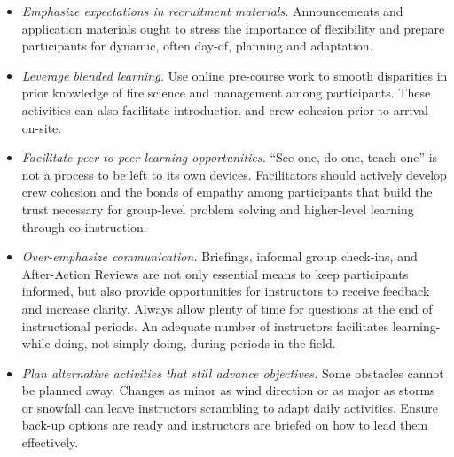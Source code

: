 \documentclass[fire,article,submit,moreauthors,pdftex]{Definitions/mdpi}
\begin{document}
\begin{itemize}
    \item \emph{Emphasize expectations in recruitment materials.} Announcements and application materials ought to stress the importance of flexibility and prepare participants for dynamic, often day-of, planning and adaptation. 
    \item \emph{Leverage blended learning.} Use online pre-course work to smooth disparities in prior knowledge of fire science and management among participants. 
    These activities can also facilitate introduction and crew cohesion prior to arrival on-site.
    \item \emph{Facilitate peer-to-peer learning opportunities.} ``See one, do one, teach one'' is not a process to be left to its own devices. Facilitators should actively develop crew cohesion and the bonds of empathy among participants that build the trust necessary for group-level problem solving and higher-level learning through co-instruction. 
    \item \emph{Over-emphasize communication.} Briefings, informal group check-ins, and After-Action Reviews are not only essential means to keep participants informed, but also provide opportunities for instructors to receive feedback and increase clarity. Always allow plenty of time for questions at the end of instructional periods. An adequate number of instructors facilitates learning-while-doing, not simply doing, during periods in the field. 
    \item \emph{Plan alternative activities that still advance objectives.} Some obstacles cannot be planned away. Changes as minor as wind direction or as major as storms or snowfall can leave instructors scrambling to adapt daily activities. Ensure back-up options are ready and instructors are briefed on how to lead them effectively. 
\end{itemize}

\vspace{6pt}

\end{document}

